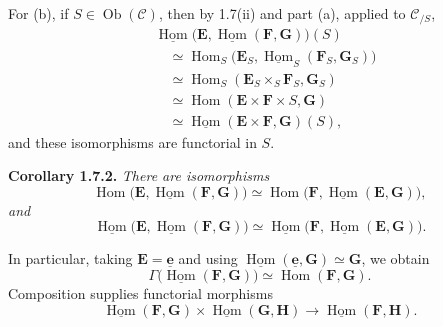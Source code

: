 For (b), if \(S\in\operatorname{Ob}(\mathscr C)\), then by 1.7(ii) and
part (a), applied to \(\mathscr C_{/S}\),
\begin{align*}
  &\underline{\operatorname{Hom}}
    \bigl(\mathbf E,
      \underline{\operatorname{Hom}}(\mathbf F,\mathbf G)\bigr)(S)\\
  &\quad\simeq
    \operatorname{Hom}_S
      \bigl(\mathbf E_S,
        \underline{\operatorname{Hom}}_S(\mathbf F_S,\mathbf G_S)\bigr)\\
  &\quad\simeq
    \operatorname{Hom}_S
      (\mathbf E_S\times_S\mathbf F_S,\mathbf G_S)\\
  &\quad\simeq
    \operatorname{Hom}(\mathbf E\times\mathbf F\times S,\mathbf G)\\
  &\quad\simeq
    \underline{\operatorname{Hom}}
      (\mathbf E\times\mathbf F,\mathbf G)(S),
\end{align*}
and these isomorphisms are functorial in \(S\).

\medskip
\noindent\textbf{Corollary 1.7.2.}
\textit{There are isomorphisms
\[
  \operatorname{Hom}
    \bigl(\mathbf E,
      \underline{\operatorname{Hom}}(\mathbf F,\mathbf G)\bigr)
    \simeq
  \operatorname{Hom}
    \bigl(\mathbf F,
      \underline{\operatorname{Hom}}(\mathbf E,\mathbf G)\bigr),
\]
and
\[
  \underline{\operatorname{Hom}}
    \bigl(\mathbf E,
      \underline{\operatorname{Hom}}(\mathbf F,\mathbf G)\bigr)
    \simeq
  \underline{\operatorname{Hom}}
    \bigl(\mathbf F,
      \underline{\operatorname{Hom}}(\mathbf E,\mathbf G)\bigr).
\]}

In particular, taking \(\mathbf E=\underline{\mathbf e}\) and using
\(\underline{\operatorname{Hom}}(\underline{\mathbf e},\mathbf G)
\simeq\mathbf G\), we obtain
\[
  \Gamma\bigl(\underline{\operatorname{Hom}}(\mathbf F,\mathbf G)\bigr)
    \simeq\operatorname{Hom}(\mathbf F,\mathbf G).
\]
Composition supplies functorial morphisms
\[
  \underline{\operatorname{Hom}}(\mathbf F,\mathbf G)
    \times
  \underline{\operatorname{Hom}}(\mathbf G,\mathbf H)
    \longrightarrow
  \underline{\operatorname{Hom}}(\mathbf F,\mathbf H).
\]

